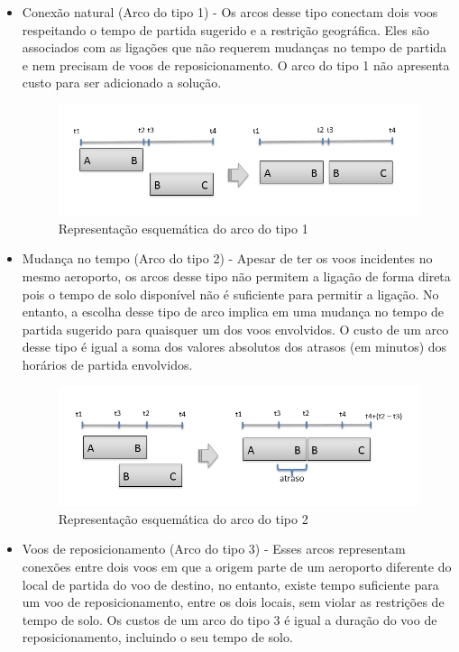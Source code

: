   
  \begin{itemize}
\item Conexão natural (Arco do tipo 1) - Os arcos desse tipo conectam dois voos respeitando o tempo de partida sugerido e
a restrição geográfica. Eles são associados com as ligações que não requerem mudanças no tempo de partida e nem
       precisam de voos de reposicionamento. O arco do tipo 1 não apresenta custo para ser adicionado a solução.

\begin{figure}[ht]
	\centering
	\includegraphics[scale=0.35]{./img/arc1}
	\caption{Representação esquemática do arco do tipo 1}
	\label{fig:arc1}
\end{figure}

\item Mudança no tempo (Arco do tipo 2) - Apesar de ter os voos incidentes no mesmo aeroporto, os arcos desse tipo não
permitem a ligação de forma direta pois o tempo de solo disponível não é suficiente para permitir a ligação. No
      entanto, a escolha desse tipo de arco implica em uma mudança no tempo de partida sugerido para quaisquer um dos
      voos envolvidos. O custo de um arco desse tipo é igual a soma dos valores absolutos dos atrasos (em minutos) dos
      horários de partida envolvidos.
      
\begin{figure}[ht]
	\centering
	\includegraphics[scale=0.35]{./img/arc2}
	\caption{Representação esquemática do arco do tipo 2}
	\label{fig:arc2}
\end{figure}

\item Voos de reposicionamento (Arco do tipo 3) - Esses arcos representam conexões entre dois voos em que a origem
parte de um aeroporto diferente do local de partida do voo de destino, no entanto, existe tempo suficiente para um voo
de reposicionamento, entre os dois locais, sem violar as restrições de tempo de solo. Os custos de um arco do tipo 3 é
  igual a duração do voo de reposicionamento, incluindo o seu tempo de solo.


\end{itemize}
